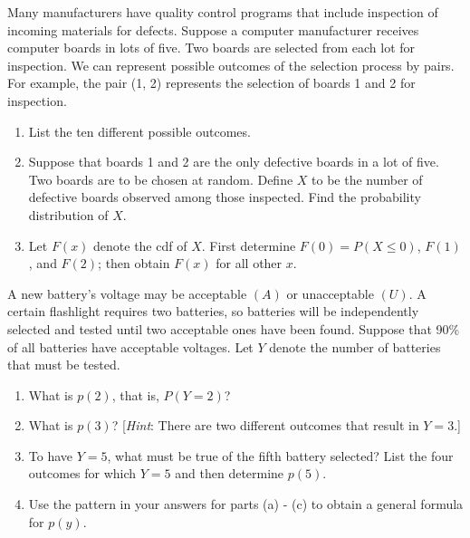 \documentclass[11pt,letterpaper,boxed]{hmcpset}
\begin{document}
{\begin{problem}[3.2.15]
	Many manufacturers have quality control programs that include inspection of incoming materials for defects. Suppose a computer manufacturer receives computer boards in lots of five. Two boards are selected from each lot for inspection. We can represent possible outcomes of the selection process by pairs. For example, the pair (1, 2) represents the selection of boards 1 and 2 for inspection.
	\begin{enumerate}
		\item
			List the ten different possible outcomes.
		\item
			Suppose that boards 1 and 2 are the only defective boards in a lot of five. Two boards are to be chosen at random. Define $X$ to be the number of defective boards observed among those inspected. Find the probability distribution of $X$.
		\item
			Let $F(x)$ denote the cdf of $X$. First determine $F(0) = P(X \leq 0)$, $F(1)$, and $F(2)$; then obtain $F(x)$ for all other $x$.
	\end{enumerate}
\end{problem}

\begin{solution}
	\vfill
\end{solution}
\newpage


\begin{problem}[3.2.17]
	A new battery's voltage may be acceptable $(A)$ or unacceptable $(U)$. A certain flashlight requires two batteries, so batteries will be independently selected and tested until two acceptable ones have been found. Suppose that 90\% of all batteries have acceptable voltages. Let $Y$ denote the number of batteries that must be tested.
	\begin{enumerate}
		\item
			What is $p(2)$, that is, $P(Y = 2)$?
		\item
			What is $p(3)$? [\textit{Hint}: There are two different outcomes that result in $Y = 3$.]
		\item
			To have $Y = 5$, what must be true of the fifth battery selected? List the four outcomes for which $Y = 5$ and then determine $p(5)$.
		\item
			Use the pattern in your answers for parts (a) - (c) to obtain a general formula for $p(y)$.
	\end{enumerate}
\end{problem}

}
\end{document}
